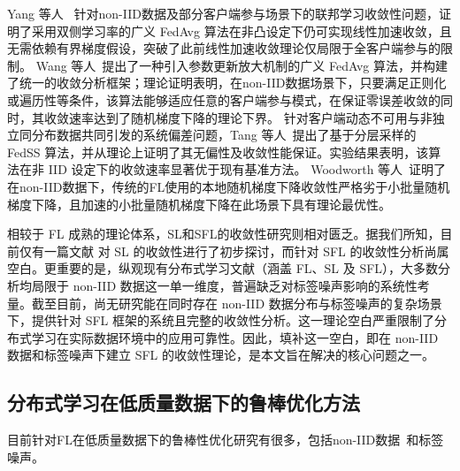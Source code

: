 Yang 等人~\cite{yang2021achieving} 针对non-IID数据及部分客户端参与场景下的联邦学习收敛性问题，证明了采用双侧学习率的广义 FedAvg 算法在非凸设定下仍可实现线性加速收敛，且无需依赖有界梯度假设，突破了此前线性加速收敛理论仅局限于全客户端参与的限制。
Wang 等人~\cite{wang2022unified}提出了一种引入参数更新放大机制的广义 FedAvg 算法，并构建了统一的收敛分析框架；理论证明表明，在non-IID数据场景下，只要满足正则化或遍历性等条件，该算法能够适应任意的客户端参与模式，在保证零误差收敛的同时，其收敛速率达到了随机梯度下降的理论下界。
针对客户端动态不可用与非独立同分布数据共同引发的系统偏差问题，Tang 等人~\cite{tang2023tackling}提出了基于分层采样的 FedSS 算法，并从理论上证明了其无偏性及收敛性能保证。实验结果表明，该算法在非 IID 设定下的收敛速率显著优于现有基准方法。
Woodworth 等人~\cite{woodworth2020minibatch}证明了在non-IID数据下，传统的FL使用的本地随机梯度下降收敛性严格劣于小批量随机梯度下降，且加速的小批量随机梯度下降在此场景下具有理论最优性。

相较于 FL 成熟的理论体系，SL和SFL的收敛性研究则相对匮乏。据我们所知，目前仅有一篇文献 \cite{li2023convergence} 对 SL 的收敛性进行了初步探讨，而针对 SFL 的收敛性分析尚属空白。更重要的是，纵观现有分布式学习文献（涵盖 FL、SL 及 SFL），大多数分析均局限于 non-IID 数据这一单一维度，普遍缺乏对标签噪声影响的系统性考量。截至目前，尚无研究能在同时存在 non-IID 数据分布与标签噪声的复杂场景下，提供针对 SFL 框架的系统且完整的收敛性分析。这一理论空白严重限制了分布式学习在实际数据环境中的应用可靠性。因此，填补这一空白，即在 non-IID 数据和标签噪声下建立 SFL 的收敛性理论，是本文旨在解决的核心问题之一。
\subsection{分布式学习在低质量数据下的鲁棒优化方法}
目前针对FL在低质量数据下的鲁棒性优化研究有很多，包括non-IID数据~\cite{li2020federated,wang2020tackling,li2021model,chen2025heterosfl}和标签噪声\cite{ke2023impact,xu2022fedcorr,wu2023fednoro,yang2022robust, ji2024fedfixer,zhou2024federated,li2024feddiv,du2025feddqc,sun2025label}。

